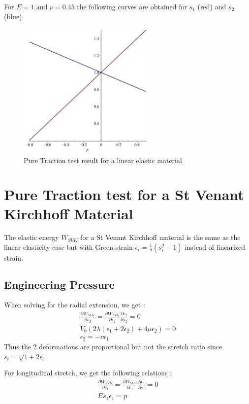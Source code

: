 \documentclass[a4paper,11pt]{article}
\begin{document}
For $E=1$ and $\nu=0.45$ the following curves are obtained for $s_1$ (red) and $s_2$ (blue).
\begin{figure}[!htbp]
	\centering
    \includegraphics[width=0.60\textwidth]{CurveLinearElasticity}
	\caption{Pure Traction test result for a linear elastic material}
	\label{fig:PureTractionLinearElasticity}
\end{figure}

\section{Pure Traction test for a St Venant Kirchhoff Material}

The elastic energy $W_{SVK}$ for a St Venant Kirchhoff material is the same as  the linear elasticity case but with Green-strain $\epsilon_i=\frac{1}{2}(s_i^2 -1)$ instead of linearized strain.
\subsection{Engineering Pressure}
When solving for the radial extension, we get :
\begin{align*}
\frac{\partial W_{SVK}}{\partial s_2} = \frac{\partial W_{SVK}}{\partial \epsilon_2}\frac{\partial \epsilon_2}{\partial s_2}= 0 \\
V_0 (2\lambda (\epsilon_1+2 \epsilon_2) + 4\mu \epsilon_2)=0 \\
\epsilon_2 = -\nu \epsilon_1
\end{align*}
Thus the 2 deformations are proportional but not the stretch ratio since $s_i=\sqrt{1+2\epsilon_i}$. 

For longitudinal stretch, we get the following relations :
\begin{align*}
\frac{\partial W_{SVK}}{\partial s_1} = \frac{\partial W_{SVK}}{\partial \epsilon_1}\frac{\partial \epsilon_1}{\partial s_1}= 0 \\
E s_1 \epsilon_1=p 
\end{align*}
\end{document}

